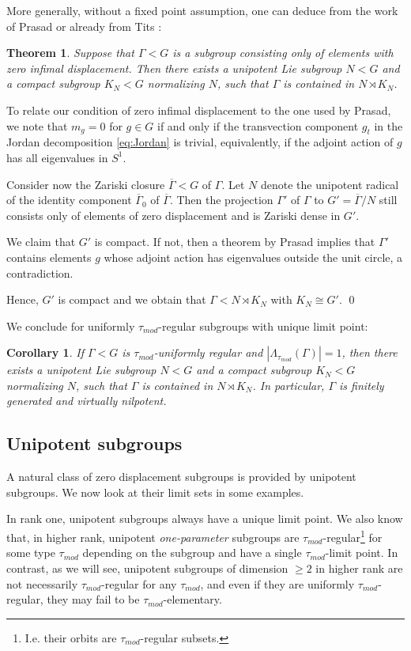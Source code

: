 \documentclass[12pt]{article}
\theoremstyle{boldplain}
\newtheorem{cor}[equation]{Corollary}
\newtheorem{thm}[equation]{Theorem}
\theoremstyle{bolddefinition}
\numberwithin{equation}{section}
\def\Ga{\Gamma}
\def\La{\Lambda}
\def\Lat{\La_{\tau_{mod}}}
\def\ol{\overline}
\def\taumod{\tau_{mod}}
\begin{document}
\medskip
More generally, without a fixed point assumption,
one can deduce from the work of Prasad \cite{Prasad} or already from Tits \cite{Tits}:

\begin{thm}\label{thm:purezero}
Suppose that $\Ga< G$ is a subgroup 
consisting only of elements with zero infimal displacement.
Then there exists a unipotent Lie subgroup $N<G$
and a compact subgroup $K_N< G$ normalizing $N$,
such that $\Ga$ is contained in $N \rtimes K_N$.
\end{thm}
\proof
To relate our condition of zero infimal displacement to the one used by Prasad,
we note that $m_g=0$ for $g\in G$ 
if and only if the transvection component $g_t$ in the Jordan decomposition \eqref{eq:Jordan} is trivial,
equivalently, if the adjoint action of $g$ has all eigenvalues in $S^1$.

Consider now the Zariski closure $\ol{\Ga}<G$  of $\Ga$.
Let $N$ denote the unipotent radical of the identity component $\ol{\Ga}_0$ of
$\ol{\Ga}$.
Then the projection $\Ga'$ of $\Ga$ to $G'=\ol{\Ga}/N$ still consists only of
elements of zero displacement and is Zariski dense in $G'$. 

We claim that $G'$ is compact. 
If not, then a theorem by Prasad \cite{Prasad} implies that 
$\Ga'$ contains elements $g$ whose adjoint action has eigenvalues outside the unit circle,
a contradiction. 

Hence, $G'$ is compact and we obtain that $\Ga< N \rtimes K_N$ with $K_N\cong G'$.
\qed

\medskip
We conclude for uniformly $\taumod$-regular subgroups with unique limit point:
\begin{cor}\label{cor:nilfg}
If $\Ga< G$ is $\taumod$-uniformly regular and $|\Lat(\Ga)|=1$,
then there exists a unipotent Lie subgroup $N<G$
and a compact subgroup $K_N< G$ normalizing $N$,
such that $\Ga$ is contained in $N \rtimes K_N$. 
In particular, $\Ga$ is finitely generated and virtually nilpotent.  
\end{cor}


\subsection{Unipotent subgroups}\label{sec:unipotent}

A natural class of zero displacement subgroups is provided by unipotent subgroups.
We now look at their limit sets in some examples.

In rank one, unipotent subgroups always have a unique limit point. 
We also know that, in higher rank, unipotent {\em one-parameter} subgroups 
are $\taumod$-regular\footnote{I.e. their orbits are $\taumod$-regular subsets.} 
for some type $\taumod$ depending on the subgroup
and have a single $\taumod$-limit point. 
In contrast, as we will see,
unipotent subgroups of dimension $\geq2$ in higher rank are not necessarily $\taumod$-regular for any $\taumod$,
and even if they are uniformly $\taumod$-regular, they may fail to be $\taumod$-elementary.
\end{document}
